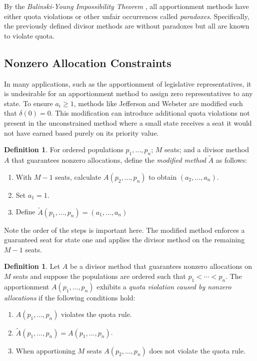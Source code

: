 \documentclass[11pt]{article}
\theoremstyle{definition}
\newtheorem{definition}[theorem]{Definition}
\theoremstyle{definition}
\begin{document}
By the \emph{Balinski-Young Impossibility Theorem} \parencite{b-young_textbook}, all apportionment methods have either quota violations or other unfair occurrences called \textit{paradoxes}. Specifically, the previously defined divisor methods are without paradoxes but all are known to violate quota.

\subsection{Nonzero Allocation Constraints}
In many applications, such as the apportionment of legislative representatives, it is undesirable for an apportionment method to assign zero representatives to any state. To ensure $a_i \geq 1$, methods like Jefferson and Webster are modified such that $\delta(0) = 0$. This modification can introduce additional quota violations not present in the unconstrained method where a small state receives a seat it would not have earned based purely on its priority value.

\begin{definition}\label{stealing_def}
For ordered populations $p_1, \dots, p_n$; $M$ seats; and a divisor method $A$ that guarantees nonzero allocations, define the \emph{modified method} $\tilde{A}$ as follows: \end{definition}
\begin{enumerate}

\item With $M-1$ seats, calculate $A(p_{2}, \dots, p_n)$ to obtain $(a_{2}, \dots, a_n)$.
\item Set $a_1 =1$.
\item Define $\tilde{A}(p_1, \dots, p_n) = (a_1, \dots, a_n)$
\end{enumerate}

Note the order of the steps is important here. The modified method enforces a guaranteed seat for state one and applies the divisor method on the remaining $M-1$ seats. 

\begin{definition}\label{vio_as_not0allo_def}
Let $A$ be a divisor method that guarantees nonzero allocations on $M$ seats and suppose the populations are ordered such that $p_1 < \cdots < p_n$. The apportionment $A(p_1, \dots, p_n)$ exhibits a \emph{quota violation caused by nonzero allocations} if the following conditions hold:
\begin{enumerate}
\item $A(p_1, \dots, p_n)$ violates the quota rule.
\item $\tilde{A}(p_1, \dots, p_n) = A(p_1, \dots, p_n)$.
\item When apportioning $M$ seats $A(p_{2}, \dots, p_n)$ does not violate the quota rule.
\end{enumerate}
\end{definition}
\end{document}
